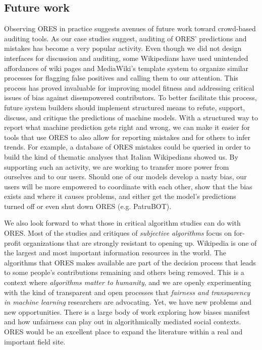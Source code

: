 \subsection{Future work}
Observing ORES in practice suggests avenues of future work toward crowd-based auditing tools.  As our case studies suggest, auditing of ORES' predictions and mistakes has become a very popular activity.  Even though we did not design interfaces for discussion and auditing, some Wikipedians have used unintended affordances of wiki pages and MediaWiki's template system to organize similar processes for flagging false positives and calling them to our attention.  This process has proved invaluable for improving model fitness and addressing critical issues of bias against disempowered contributors.  To better facilitate this process, future system builders should implement structured means to refute, support, discuss, and critique the predictions of machine models.  With a structured way to report what machine prediction gets right and wrong, we can make it easier for tools that use ORES to also allow for reporting mistakes and for others to infer trends.  For example, a database of ORES mistakes could be queried in order to build the kind of thematic analyses that Italian Wikipedians showed us.  By supporting such an activity, we are working to transfer more power from ourselves and to our users.  Should one of our models develop a nasty bias, our users will be more empowered to coordinate with each other, show that the bias exists and where it causes problems, and either get the model's predictions turned off or even shut down ORES (e.g. PatruBOT).

We also look forward to what those in critical algorithm studies can do with ORES. Most of the studies and critiques of \emph{subjective algorithms}\cite{tufekci2015algorithms} focus on for-profit organizations that are strongly resistant to opening up. Wikipedia is one of the largest and most important information resources in the world.  The algorithms that ORES makes available are part of the decision process that leads to some people's contributions remaining and others being removed.  This is a context where \emph{algorithms matter to humanity}, and we are openly experimenting with the kind of transparent and open processes that \emph{fairness and transparency in machine learning} researchers are advocating.  Yet, we have new problems and new opportunities.  There is a large body of work exploring how biases manifest and how unfairness can play out in algorithmically mediated social contexts.  ORES would be an excellent place to expand the literature within a real and important field site.

